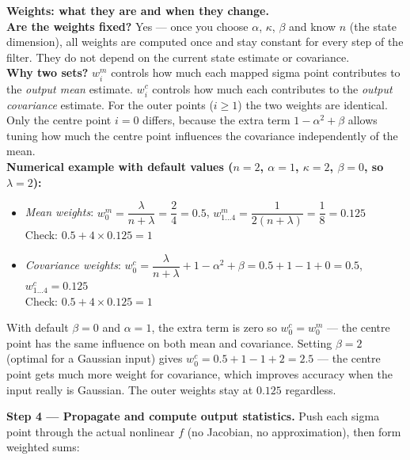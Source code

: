 \documentclass[12pt, a4paper]{article}
\begin{document}
\begin{notebox}
  \textbf{Weights: what they are and when they change.}\\[4pt]
  \textbf{Are the weights fixed?}
  Yes --- once you choose $\alpha$, $\kappa$, $\beta$ and know $n$
  (the state dimension), all weights are computed once and stay
  constant for every step of the filter.
  They do not depend on the current state estimate or covariance.\\[4pt]
  \textbf{Why two sets?}
  $w_i^m$ controls how much each mapped sigma point contributes to
  the \emph{output mean} estimate.
  $w_i^c$ controls how much each contributes to the
  \emph{output covariance} estimate.
  For the outer points ($i \geq 1$) the two weights are identical.
  Only the centre point $i=0$ differs, because the extra term
  $1 - \alpha^2 + \beta$ allows tuning how much the centre point
  influences the covariance independently of the mean.\\[4pt]
  \textbf{Numerical example with default values ($n=2$,
  $\alpha=1$, $\kappa=2$, $\beta=0$, so $\lambda=2$):}
  \begin{itemize}[leftmargin=1.4em, topsep=2pt]
    \item \textit{Mean weights}:
          $w_0^m = \dfrac{\lambda}{n+\lambda} = \dfrac{2}{4} = 0.5$,
          \quad $w_{1\ldots4}^m = \dfrac{1}{2(n+\lambda)} = \dfrac{1}{8} = 0.125$\\
          Check: $0.5 + 4\times 0.125 = 1$ \checkmark
    \item \textit{Covariance weights}:
          $w_0^c = \dfrac{\lambda}{n+\lambda} + 1 - \alpha^2 + \beta
          = 0.5 + 1 - 1 + 0 = 0.5$,
          \quad $w_{1\ldots4}^c = 0.125$\\
          Check: $0.5 + 4\times 0.125 = 1$ \checkmark
  \end{itemize}
  With default $\beta=0$ and $\alpha=1$, the extra term is zero so
  $w_0^c = w_0^m$ --- the centre point has the same influence on both
  mean and covariance.
  Setting $\beta=2$ (optimal for a Gaussian input) gives
  $w_0^c = 0.5 + 1 - 1 + 2 = 2.5$ --- the centre point gets much
  more weight for covariance, which improves accuracy when the input
  really is Gaussian.
  The outer weights stay at $0.125$ regardless.
\end{notebox}

\textbf{Step 4 --- Propagate and compute output statistics.}
Push each sigma point through the actual nonlinear $f$
(no Jacobian, no approximation), then form weighted sums:
\end{document}
